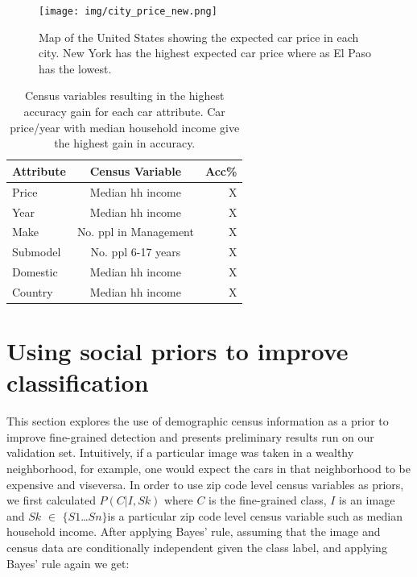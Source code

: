 \documentclass[10pt,twocolumn,letterpaper]{article}
\begin{document}
\begin{figure}[t]
\begin{center}
    \texttt{[image: img/city\_price\_new.png]}
\end{center}
   \caption {Map of the United States showing the expected car price in each city. New York has the highest expected car price where as El Paso has the lowest.}
\label{fig:city_price}
\end{figure}

\begin{table}
\begin{center}
\begin{tabular}{|l|c|r|}
\hline
\textbf{Attribute} & \textbf{Census Variable}& \textbf{Acc\%}\\
\hline\hline
Price & Median hh income & X\\
Year  & Median hh income & X\\
Make & No. ppl in Management&X\\
Submodel & No. ppl 6-17 years&X\\
Domestic & Median hh income &X\\
Country & Median hh income & X\\
\hline
\end{tabular}
\end{center}
\caption{Census variables resulting in the highest accuracy gain for each car attribute. Car price/year with median household income give the highest gain in accuracy.}
\label{table:prior-acc}
\end{table}

\section{Using social priors to improve classification}
\label{sec:prior}
This section explores the use of demographic census information as a prior to improve fine-grained detection and presents preliminary results run on our validation set. Intuitively, if a particular image was taken in a wealthy neighborhood, for example, one would expect the cars in that neighborhood to be expensive and viseversa. In order to use zip code level census variables as priors, we first calculated \(P(C|I,Sk)\) where \(C\) is the fine-grained class, \(I\) is an image and \(Sk\) \(\in\) \(\{\)\(S1\)\ldots \(Sn\)\(\}\)is a particular zip code level census variable such as median household income. After applying Bayes' rule, assuming that the image and census data are conditionally independent given the class label, and applying Bayes' rule again we get:
\end{document}
